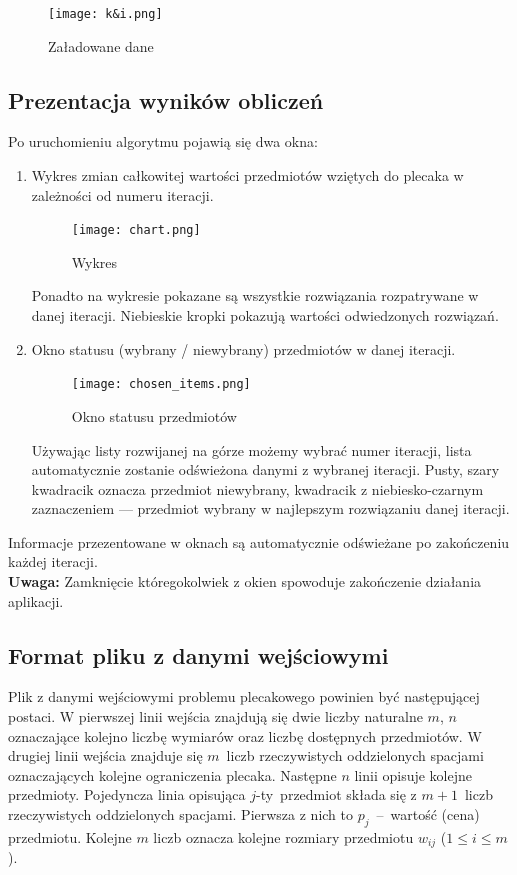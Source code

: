 \documentclass[a4paper,12pt,notitlepage]{mwrep}
\begin{document}
\begin{figure}[H]
\centering
\texttt{[image: k\&i.png]}
\caption{Załadowane dane}
\label{fig:ki}
\end{figure}

\subsection{Prezentacja wyników obliczeń}
Po uruchomieniu algorytmu pojawią się dwa okna:
\begin{enumerate}
	\item	Wykres zmian całkowitej wartości przedmiotów wziętych do plecaka
			w zależności od numeru iteracji.\\
			\begin{figure}[h]
			\centering
			\texttt{[image: chart.png]}
			\caption{Wykres}
			\label{fig:chart}
			\end{figure}
			Ponadto na wykresie pokazane są wszystkie rozwiązania rozpatrywane w danej iteracji.
			Niebieskie kropki pokazują wartości odwiedzonych rozwiązań.
	\item	Okno statusu (wybrany / niewybrany) przedmiotów w danej iteracji.\\
			\begin{figure}[h]
			\centering
			\texttt{[image: chosen\_items.png]}
			\caption{Okno statusu przedmiotów}
			\label{fig:chosen_items}
			\end{figure}
			Używając listy rozwijanej na górze możemy wybrać numer iteracji,
			lista automatycznie zostanie odświeżona danymi z wybranej iteracji.
			Pusty, szary kwadracik oznacza przedmiot niewybrany, kwadracik z niebiesko-czarnym
			zaznaczeniem --- przedmiot wybrany w najlepszym rozwiązaniu danej iteracji.
\end{enumerate}
Informacje przezentowane w oknach są automatycznie odświeżane po zakończeniu każdej iteracji.\\
\textbf{Uwaga:} Zamknięcie któregokolwiek z okien spowoduje zakończenie działania aplikacji.


\subsection{Format pliku z danymi wejściowymi} \label{format}
Plik z danymi wejściowymi problemu plecakowego powinien być następującej postaci. W pierwszej
linii wejścia znajdują się dwie liczby naturalne $m$, $n$ oznaczające kolejno liczbę wymiarów
oraz liczbę dostępnych przedmiotów. W drugiej linii wejścia znajduje się $m$~liczb rzeczywistych oddzielonych
spacjami oznaczających kolejne ograniczenia plecaka. Następne $n$ linii opisuje kolejne przedmioty.
Pojedyncza linia opisująca $j$-ty~przedmiot składa się z $m+1$~liczb rzeczywistych oddzielonych spacjami.
Pierwsza z nich to $p_j$~--~wartość (cena)
przedmiotu. Kolejne $m$ liczb oznacza kolejne rozmiary przedmiotu $w_{ij}$  ($1 \le i \le m$).
\end{document}
